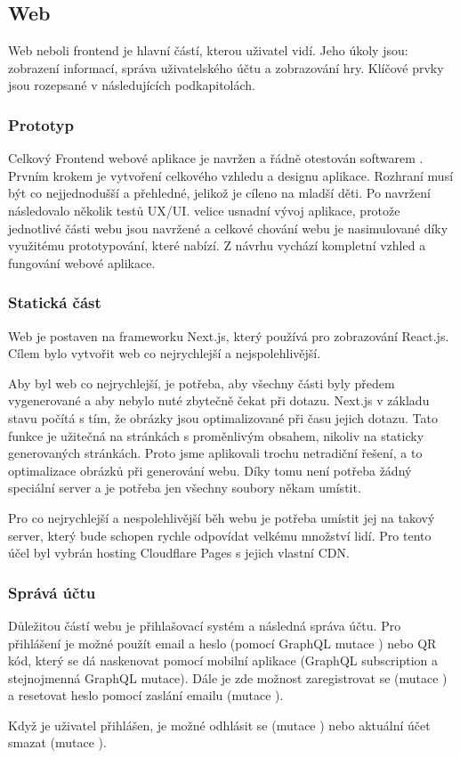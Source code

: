 \subsection{Web}
Web neboli frontend je hlavní částí, kterou uživatel vidí. Jeho úkoly jsou: zobrazení informací, správa uživatelského účtu a zobrazování hry. Klíčové prvky jsou rozepsané v následujících podkapitolách.

\subsubsection{Prototyp}
Celkový Frontend webové aplikace je navržen a řádně otestován softwarem . Prvním krokem je vytvoření celkového vzhledu a designu aplikace. Rozhraní musí být co nejjednodušší a přehledné, jelikož je cíleno na mladší děti. Po navržení následovalo několik testů UX/UI.  velice usnadní vývoj aplikace, protože jednotlivé části webu jsou navržené a celkové chování webu je nasimulované díky využitému prototypování, které  nabízí. Z návrhu vychází kompletní vzhled a fungování webové aplikace.

\subsubsection{Statická část}
Web je postaven na frameworku Next.js, který používá pro zobrazování React.js. Cílem bylo vytvořit web co nejrychlejší a nejspolehlivější.\par
Aby byl web co nejrychlejší, je potřeba, aby všechny části byly předem vygenerované a aby nebylo nuté zbytečně čekat při dotazu. Next.js v základu stavu počítá s tím, že obrázky jsou optimalizované při času jejich dotazu. Tato funkce je užitečná na stránkách s proměnlivým obsahem, nikoliv na staticky generovaných stránkách. Proto jsme aplikovali trochu netradiční řešení, a to optimalizace obrázků při generování webu. Díky tomu není potřeba žádný speciální server a je potřeba jen všechny soubory někam umístit.\par
Pro co nejrychlejší a nespolehlivější běh webu je potřeba umístit jej na takový server, který bude schopen rychle odpovídat velkému množství lidí. Pro tento účel byl vybrán hosting Cloudflare Pages\cite{Cloudflare-pages} s jejich vlastní CDN\cite{Cloudflare-cdn}. 

\subsubsection{Správá účtu}
Důležitou částí webu je přihlašovací systém a následná správa účtu. Pro přihlášení je možné použít email a heslo (pomocí GraphQL mutace ) nebo QR kód, který se dá naskenovat pomocí mobilní aplikace (GraphQL subscription  a stejnojmenná GraphQL mutace). Dále je zde možnost zaregistrovat se (mutace ) a resetovat heslo pomocí zaslání emailu (mutace ).\par
Když je uživatel přihlášen, je možné odhlásit se (mutace ) nebo aktuální účet smazat (mutace ).

